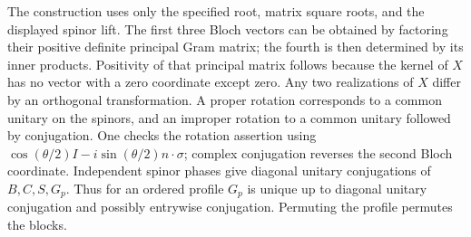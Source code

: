 \begin{remark}\label{alg:construction-choices}
The construction uses only the specified root, matrix square roots,
and the displayed spinor lift. The first three Bloch vectors can be
obtained by factoring their positive definite principal Gram matrix;
the fourth is then determined by its inner products. Positivity of
that principal matrix follows because the kernel of $X$ has no vector
with a zero coordinate except zero. Any two realizations of $X$ differ
by an orthogonal transformation. A proper rotation corresponds to a
common unitary on the spinors, and an improper rotation to a common
unitary followed by conjugation. One checks the rotation assertion
using $\cos(\theta/2)I-i\sin(\theta/2)n\cdot\sigma$; complex conjugation
reverses the second Bloch coordinate. Independent spinor phases give
diagonal unitary conjugations of $B,C,S,G_p$. Thus for an ordered
profile $G_p$ is unique up to diagonal unitary conjugation and possibly
entrywise conjugation. Permuting the profile permutes the blocks.
\end{remark}

